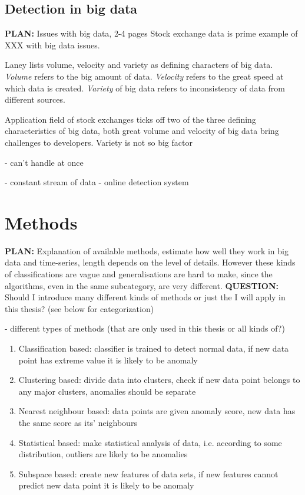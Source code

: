 \documentclass{tut-thesis}
\begin{document}
\subsection{Detection in big data}
\textbf{PLAN:} Issues with big data, 2-4 pages
Stock exchange data is prime example of XXX with big data issues.

Laney \autocite*{Laney2001} lists volume, velocity and variety as defining characters of big data. 
\textit{Volume} refers to the big amount of data.
\textit{Velocity} refers to the great speed at which data is created.
\textit{Variety} of big data refers to inconsistency of data from different sources. 

Application field of stock exchanges ticks off two of the three defining characteristics of big data, both great volume and velocity of big data bring challenges to developers. Variety is not so big factor

- can't handle at once

- constant stream of data
- online detection system


\section{Methods}
\textbf{PLAN:} Explanation of available methods, estimate how well they work in big data and time-series, length depends on the level of details. However these kinds of classifications are vague and generalisations are hard to make, since the algorithms, even in the same subcategory, are very different. 
\textbf{QUESTION:} Should I introduce many different kinds of methods or just the I will apply in this thesis? (see below for categorization)

- different types of methods (that are only used in this thesis or all kinds of?)
\begin{enumerate}
	\item Classification based: classifier is trained to detect normal data, if new data point has extreme value it is likely to be anomaly
	\item Clustering based: divide data into clusters, check if new data point belongs to any major clusters, anomalies should be separate 
	\item Nearest neighbour based: data points are given anomaly score, new data has the same score as its' neighbours
	\item Statistical based: make statistical analysis of data, i.e. according to some distribution, outliers are likely to be anomalies
	\item Subspace based: create new features of data sets, if new features cannot predict new data point it is likely to be anomaly
\end{enumerate}
\end{document}
